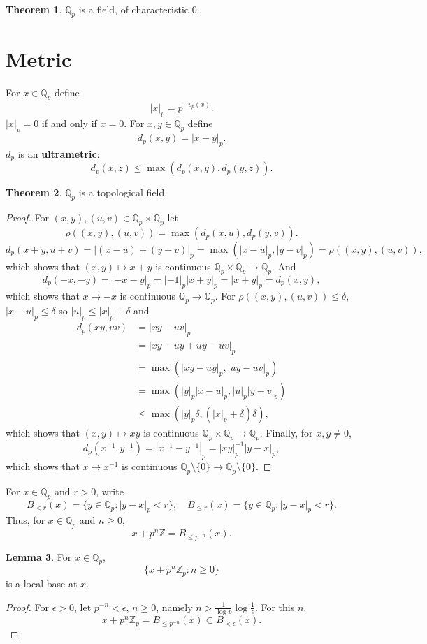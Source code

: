 \documentclass{article}
\theoremstyle{definition}
\newtheorem{theorem}{Theorem}
\newtheorem{lemma}[theorem]{Lemma}
\theoremstyle{definition}
\begin{document}
\begin{theorem}
$\mathbb{Q}_p$ is a field, of characteristic $0$.
\end{theorem}



\section{Metric}
For $x \in \mathbb{Q}_p$ define 
\[
|x|_p = p^{-v_p(x)}.
\]
$|x|_p=0$ if and only if $x=0$. For $x,y \in \mathbb{Q}_p$ define
\[
d_p(x,y) = |x-y|_p.
\]
$d_p$ is an \textbf{ultrametric}: 
\[
d_p(x,z) \leq \max(d_p(x,y),d_p(y,z)).
\]


\begin{theorem}
$\mathbb{Q}_p$ is a topological field.
\end{theorem}
\begin{proof}
For $(x,y),(u,v) \in \mathbb{Q}_p \times \mathbb{Q}_p$ let
\[
\rho((x,y),(u,v)) = \max(d_p(x,u),d_p(y,v)).
\]
\[
d_p(x+y,u+v) = |(x-u)+(y-v)|_p = \max(|x-u|_p,|y-v|_p) = \rho((x,y),(u,v)),
\]
which shows that $(x,y) \mapsto x+y$ is continuous $\mathbb{Q}_p \times \mathbb{Q}_p \to \mathbb{Q}_p$.
And
\[
d_p(-x,-y) = |-x-y|_p = |-1|_p |x+y|_p = |x+y|_p = d_p(x,y),
\]
which shows that $x \mapsto -x$ is continuous $\mathbb{Q}_p \to \mathbb{Q}_p$.
For $\rho((x,y),(u,v)) \leq \delta$, $|x-u|_p \leq \delta$ so $|u|_p \leq |x|_p +\delta$ and
\begin{align*}
d_p(xy,uv) &= |xy-uv|_p\\
&= |xy-uy+uy-uv|_p\\
&=\max(|xy-uy|_p,|uy-uv|_p)\\
&=\max(|y|_p |x-u|_p,|u|_p|y- v|_p)\\
&\leq \max(|y|_p \delta, (|x|_p+\delta)\delta),
\end{align*}
which shows that $(x,y) \mapsto xy$ is continuous $\mathbb{Q}_p \times \mathbb{Q}_p \to \mathbb{Q}_p$.
Finally, for $x,y \neq 0$,
\[
d_p(x^{-1},y^{-1}) = |x^{-1}-y^{-1}|_p = |xy|_p^{-1} |y-x|_p,
\]
which shows that $x \mapsto x^{-1}$ is continuous $\mathbb{Q}_p \setminus \{0\} \to \mathbb{Q}_p \setminus \{0\}$.
\end{proof}

For $x \in \mathbb{Q}_p$ and $r>0$, write
\[
B_{<r}(x) = \{y \in \mathbb{Q}_p: |y-x|_p<r\},
\quad 
B_{\leq r}(x) = \{y \in \mathbb{Q}_p: |y-x|_p<r\}.
\]
Thus, for $x \in \mathbb{Q}_p$ and $n \geq 0$,
\[
x+p^n \mathbb{Z} = B_{\leq p^{-n}}(x).
\]

\begin{lemma}
For $x \in \mathbb{Q}_p$, 
\[
\{x+p^n \mathbb{Z}_p: n \geq 0\}
\]
is a local base at $x$.
\label{localbase}
\end{lemma}
\begin{proof}
For $\epsilon>0$, let $p^{-n}<\epsilon$, $n \geq 0$, namely $n > \frac{1}{\log p} \log \frac{1}{\epsilon}$. For this $n$,
\[
x+p^n \mathbb{Z}_p = B_{\leq p^{-n}}(x) \subset B_{<\epsilon}(x).
\]
\end{proof}
\end{document}
